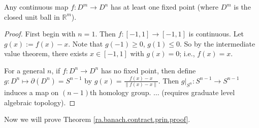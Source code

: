 \begin{theorem}

Any continuous map \(f: D^m \to D^n\) has at least one fixed point (where \(D^m\) is the closed unit ball in \(\mathbb{R}^m\)).

\end{theorem}

\begin{proof}

First begin with \(n=1\). Then \(f: [-1,1] \to [-1,1]\) is continuous. Let \(g(x) := f(x) - x\). Note that \(g(-1) \geq 0\), \(g(1) \leq 0\). So by the intermediate value theorem, there exists \(x \in [-1,1]\) with \(g(x) = 0\); i.e., \(f(x) = x\). 

For a general \(n\), if \(f: D^n \to D^n\) has no fixed point, then define \(g: D^n \mapsto \partial (D^n) = S^{n-1}\) by \(g(x) = \frac{f(x)- x}{\lVert f(x) - x \rVert}\). Then \(g \big|_{S^n}: S^{n-1} \to S^{n-1}\) induces a map on \((n-1)\)th homology group. \(\ldots\) (requires graduate level algebraic topology).

\end{proof}

Now we will prove Theorem \ref{ra.banach.contract.prin.proof}.


